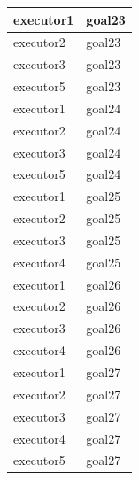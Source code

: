 \documentclass[12pt]{article}
\begin{document}
\begin{table}[H]
\begin{tabular}{|l|l|}
executor1 & goal23 \\ \hline
executor2 & goal23 \\ \hline
executor3 & goal23 \\ \hline
executor5 & goal23 \\ \hline
executor1 & goal24 \\ \hline
executor2 & goal24 \\ \hline
executor3 & goal24 \\ \hline
executor5 & goal24 \\ \hline
executor1 & goal25 \\ \hline
executor2 & goal25 \\ \hline
executor3 & goal25 \\ \hline
executor4 & goal25 \\ \hline
executor1 & goal26 \\ \hline
executor2 & goal26 \\ \hline
executor3 & goal26 \\ \hline
executor4 & goal26 \\ \hline
executor1 & goal27 \\ \hline
executor2 & goal27 \\ \hline
executor3 & goal27 \\ \hline
executor4 & goal27 \\ \hline
executor5 & goal27 \\ \hline
\end{tabular}
\end{table}
	
\end{document}
